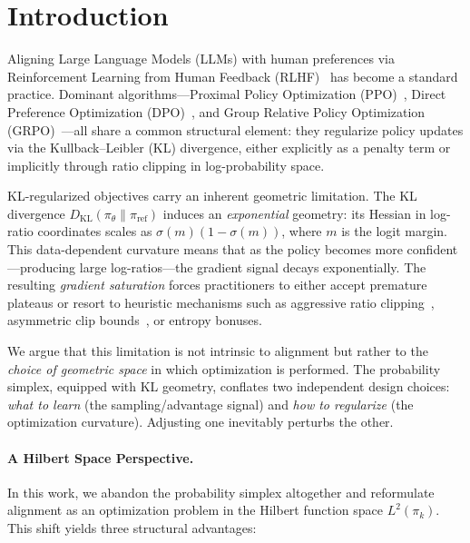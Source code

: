 \documentclass[11pt]{article}
\theoremstyle{definition}
\theoremstyle{remark}
\newcommand{\KL}{\mathrm{KL}}
\newcommand{\piref}{\pi_{\mathrm{ref}}}
\newcommand{\pik}{\pi_k}
\begin{document}
\section{Introduction}
\label{sec:intro}

Aligning Large Language Models (LLMs) with human preferences via Reinforcement Learning from Human Feedback (RLHF)~\cite{Christiano2017RLHF,Ouyang2022InstructGPT} has become a standard practice. Dominant algorithms---Proximal Policy Optimization (PPO)~\cite{Schulman2017PPO}, Direct Preference Optimization (DPO)~\cite{Rafailov2023DPO}, and Group Relative Policy Optimization (GRPO)~\cite{Shao2024GRPO}---all share a common structural element: they regularize policy updates via the Kullback--Leibler (KL) divergence, either explicitly as a penalty term or implicitly through ratio clipping in log-probability space.

KL-regularized objectives carry an inherent geometric limitation. The KL divergence $D_{\KL}(\pi_\theta \| \piref)$ induces an \emph{exponential} geometry: its Hessian in log-ratio coordinates scales as $\sigma(m)(1-\sigma(m))$, where $m$ is the logit margin. This data-dependent curvature means that as the policy becomes more confident---producing large log-ratios---the gradient signal decays exponentially. The resulting \emph{gradient saturation} forces practitioners to either accept premature plateaus or resort to heuristic mechanisms such as aggressive ratio clipping~\cite{Schulman2017PPO}, asymmetric clip bounds~\cite{Yu2025DAPO}, or entropy bonuses.

We argue that this limitation is not intrinsic to alignment but rather to the \emph{choice of geometric space} in which optimization is performed. The probability simplex, equipped with KL geometry, conflates two independent design choices: \emph{what to learn} (the sampling/advantage signal) and \emph{how to regularize} (the optimization curvature). Adjusting one inevitably perturbs the other.

\paragraph{A Hilbert Space Perspective.} In this work, we abandon the probability simplex altogether and reformulate alignment as an optimization problem in the Hilbert function space $L^2(\pik)$. This shift yields three structural advantages:
\end{document}
